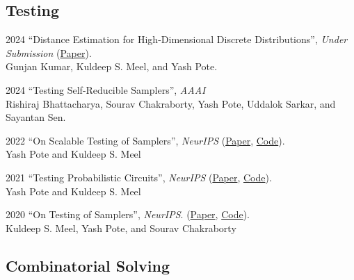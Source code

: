 \documentclass[12pt,letterpaper]{report}
\begin{document}
	
	\subsection*{Testing}
	\begin{tablist} 
		
		\item[2024] \tab  	\enquote{Distance Estimation for High-Dimensional Discrete Distributions}, \textit{Under Submission} (\href{https://arxiv.org/abs/2308.04264}{Paper}).\\
		Gunjan Kumar,  Kuldeep S. Meel, and Yash Pote.

    	\item[2024] \tab \enquote{Testing Self-Reducible Samplers},  \textit{AAAI}\\
		Rishiraj Bhattacharya, Sourav Chakraborty, Yash Pote, Uddalok Sarkar, and Sayantan Sen.
		
		\item[2022] \tab  \enquote{On Scalable Testing of Samplers},  \textit{NeurIPS}  (\href{https://arxiv.org/abs/2306.13958}{Paper}, \href{https://github.com/meelgroup/barbarik}{Code}).\\
		Yash Pote  and Kuldeep S. Meel
		
	
		\item[2021] \tab  \enquote{Testing Probabilistic Circuits},  \textit{NeurIPS}  (\href{https://arxiv.org/abs/2112.04941}{Paper}, \href{https://github.com/meelgroup/teq}{Code}).\\
		Yash Pote  and Kuldeep S. Meel
		
		
		\item[2020] \tab  \enquote{On Testing of Samplers}, \textit{NeurIPS}. (\href{https://arxiv.org/abs/2010.12918}{Paper}, \href{https://github.com/meelgroup/barbarik}{Code}).\\
		Kuldeep S. Meel, Yash Pote, and Sourav Chakraborty
		
	\end{tablist}

	\subsection*{Combinatorial Solving}
\end{document}
